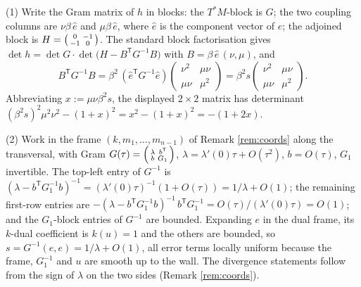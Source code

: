 (1) Write the Gram matrix of $h$ in blocks: the $T^*M$-block is $G$; the two coupling columns are $\nu\beta\,\hat e$ and $\mu\beta\,\hat e$, where $\hat e$ is the component vector of $e$; the adjoined block is $H = \begin{psmallmatrix} 0 & -1 \\ -1 & 0\end{psmallmatrix}$. The standard block factorisation gives $\det h = \det G \cdot \det\bigl(H - B^{\mathsf T} G^{-1} B\bigr)$ with $B = \beta\,\hat e\,(\nu, \mu)$, and
\[
B^{\mathsf T} G^{-1} B = \beta^2\, (\hat e^{\mathsf T} G^{-1} \hat e) \begin{pmatrix} \nu^2 & \mu\nu \\ \mu\nu & \mu^2 \end{pmatrix} = \beta^2 s \begin{pmatrix} \nu^2 & \mu\nu \\ \mu\nu & \mu^2 \end{pmatrix}.
\]
Abbreviating $x := \mu\nu\beta^2 s$, the displayed $2 \times 2$ matrix has determinant $(\beta^2 s)^2\mu^2\nu^2 - (1 + x)^2 = x^2 - (1+x)^2 = -(1 + 2x)$.

(2) Work in the frame $(k, m_1, \dots, m_{n-1})$ of Remark \ref{rem:coords} along the transversal, with Gram $G(\tau) = \begin{psmallmatrix} \lambda & b^{\mathsf T} \\ b & G_1 \end{psmallmatrix}$, $\lambda = \lambda'(0)\tau + O(\tau^2)$, $b = O(\tau)$, $G_1$ invertible. The top-left entry of $G^{-1}$ is $(\lambda - b^{\mathsf T} G_1^{-1} b)^{-1} = (\lambda'(0)\tau)^{-1}(1 + O(\tau)) = 1/\lambda + O(1)$; the remaining first-row entries are $-(\lambda - b^{\mathsf T} G_1^{-1} b)^{-1}\, b^{\mathsf T} G_1^{-1} = O(\tau)/(\lambda'(0)\tau) = O(1)$; and the $G_1$-block entries of $G^{-1}$ are bounded. Expanding $e$ in the dual frame, its $k$-dual coefficient is $k(u) = 1$ and the others are bounded, so $s = G^{-1}(e,e) = 1/\lambda + O(1)$, all error terms locally uniform because the frame, $G_1^{-1}$ and $u$ are smooth up to the wall. The divergence statements follow from the sign of $\lambda$ on the two sides (Remark \ref{rem:coords}).

